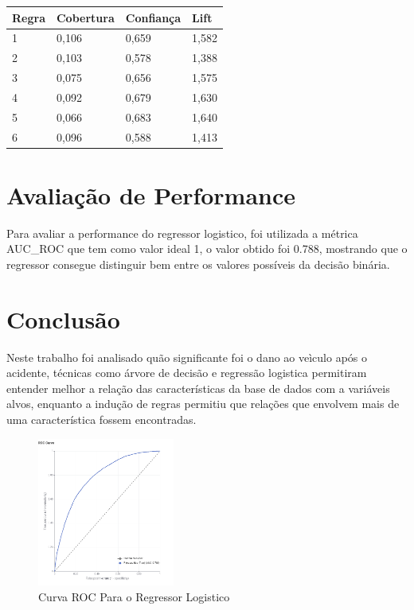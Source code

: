 \documentclass[conference]{IEEEtran}
\begin{document}
\begin{table}[!ht]
    \centering
    \begin{tabular}{|l|l|l|l|}
    \hline
        Regra & Cobertura & Confiança & Lift \\ \hline
        1 & 0,106 & 0,659 & 1,582 \\ \hline
        2 & 0,103 & 0,578 & 1,388 \\ \hline
        3 & 0,075 & 0,656 & 1,575 \\ \hline
        4 & 0,092 & 0,679 & 1,630 \\ \hline
        5 & 0,066 & 0,683 & 1,640 \\ \hline
        6 & 0,096 & 0,588 & 1,413 \\ \hline
    \end{tabular}
\end{table}



\section{Avaliação de Performance}
Para avaliar a performance do regressor logistico, foi utilizada a métrica AUC\_ROC que tem como
valor ideal 1, o valor obtido foi 0.788, mostrando que o regressor consegue distinguir bem entre
os valores possíveis da decisão binária.

\section{Conclusão}
Neste trabalho foi analisado quão significante foi o dano ao veìculo após o acidente,
técnicas como árvore de decisão e regressão logistica permitiram entender melhor a 
relação das características da base de dados com a variáveis alvos, enquanto a indução
de regras permitiu que relações que envolvem mais de uma característica fossem encontradas.



\begin{figure}[H]
    \centerline{\includegraphics[width=0.4\textwidth]{Images/roc-curve-regressor.png}}
    \caption{\label{fig:decision-tree} Curva ROC Para o Regressor Logistico}
\end{figure}


\nocite{*}

\end{document}
